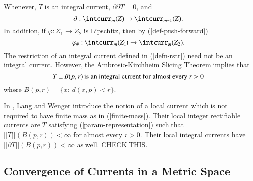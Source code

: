 \documentclass[12pt]{amsart}
\begin{document}
Whenever, $T$ is an integral current, $\partial \partial T=0$, and
\begin{equation}
\partial: \intcurr_m(Z) \to \intcurr_{m-1}(Z).
\end{equation}
In addition, if 
$\varphi: Z_1 \to Z_2$ is Lipschitz, then by (\ref{def-push-forward})
\begin{equation}
\varphi_{\#}: \intcurr_m(Z_1) \to \intcurr_{m}(Z_2).
\end{equation}
The restriction of an integral current defined in (\ref{defn-rstr}) need not be 
an integral current.  However,
the Ambrosio-Kirchheim Slicing Theorem implies that
\begin{equation}\label{rstr-balls}
T{\:\mbox{\rule{0.1ex}{1.2ex}\rule{1.1ex}{0.1ex}}\:} B(p,r) \textrm{ is an integral current for almost every }r>0
\end{equation}  
where $B(p,r)=\{x:\, d(x,p)<r\}$.  

In \cite{Lang-Wenger}, Lang and Wenger introduce the notion of
a local current which is not required to have finite mass as in 
(\ref{finite-mass}).   Their local integer rectifiable currents are $T$
satisfying (\ref{param-representation}) such that $||T||(B(p,r))<\infty$
for almost every $r>0$.  Their local integral currents  
have $||\partial T||(B(p,r))<\infty$ as well.   CHECK THIS.

\subsection{Convergence of Currents in a Metric Space}
 
\end{document}
